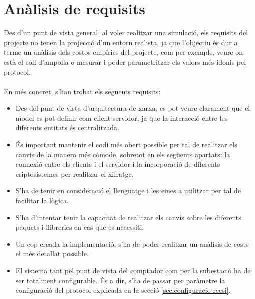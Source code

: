 \newcommand{\java}{Java 8}
\newcommand{\mavenLarge}{Apache Maven 3.6.3}
\newcommand{\maven}{\texttt{maven} }
\newcommand{\ciglib}{\texttt{CigLib} }
\newcommand{\toml}{\texttt{Toml}}


\section{Anàlisis de requisits}
Des d'un punt de vista general, al voler realitzar una simulació, els requisits del projecte no tenen la projecció d'un entorn realista, ja que l'objectiu és dur a terme un anàlisis dels costos empírics del projecte, com per exemple, veure on està el coll d'ampolla o mesurar i poder parametritzar els valors més idonis pel protocol.
\\
\\
En més concret, s'han trobat els següents requisits:
\begin{itemize}
	\item Des del punt de vista d'arquitectura de xarxa, es pot veure clarament que el model es pot definir com client-servidor, ja que la interacció entre les diferents entitats és centralitzada.
	\item És important mantenir el codi més obert possible per tal de realitzar els canvis de la manera més còmode, sobretot en els següents apartats: la connexió entre els clients i el servidor i la incorporació de diferents criptosistemes per realitzar el xifratge.
	\item S'ha de tenir en consideració el llenguatge i les eines a utilitzar per tal de facilitar la lògica.
	\item S'ha d'intentar tenir la capacitat de realitzar els canvis sobre les diferents paquets i llibreries en cas que es necessiti.
	\item Un cop creada la implementació, s'ha de poder realitzar un anàlisis de costs el més detallat possible.
	\item El sistema tant pel punt de vista del comptador com per la subestació ha de ser totalment configurable. És a dir, s'ha de passar per paràmetre la configuració del protocol explicada en la secció \ref{sec:configuracio-recsi}.
\end{itemize}
